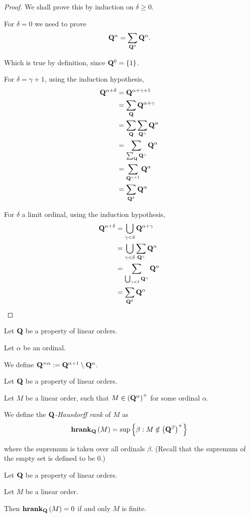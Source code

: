 \begin{proof}
  We shall prove this by induction on $\delta \ge 0$.

  For $\delta = 0$ we need to prove
  \[
    \mathbf{Q}^{\alpha} = \sum_{\mathbf{Q}^0}{\mathbf{Q}^{\alpha}}.
  \]

  Which is true by definition, since $\mathbf{Q}^0 = \left\{ {1} \right\}$.

  For $\delta = \gamma + 1$, using the induction hypothesis,
  \[
    \begin{aligned}
      \mathbf{Q}^{\alpha + \delta}
       & = \mathbf{Q}^{\alpha + \gamma + 1}                     \\
       & = \sum_{\mathbf{Q}}{\mathbf{Q}^{\alpha + \gamma}}             \\
       & = \sum_{\mathbf{Q}}{\sum_{\mathbf{Q}^{\gamma}}{\mathbf{Q}^{\alpha}}} \\
       & = \sum_{\sum_{\mathbf{Q}}{\mathbf{Q}^{\gamma}}}{\mathbf{Q}^{\alpha}} \\
       & = \sum_{\mathbf{Q}^{\gamma + 1}}{\mathbf{Q}^{\alpha}}         \\
       & = \sum_{\mathbf{Q}^{\delta}}{\mathbf{Q}^{\alpha}}
    \end{aligned}
  \]

  For $\delta$ a limit ordinal, using the induction hypothesis,
  \[
    \begin{aligned}
      \mathbf{Q}^{\alpha + \delta}
       & = \bigcup_{\gamma < \delta}{\mathbf{Q}^{\alpha + \gamma}}             \\
       & = \bigcup_{\gamma < \delta}{\sum_{\mathbf{Q}^{\gamma}}{\mathbf{Q}^{\alpha}}} \\
       & = \sum_{\bigcup_{\gamma < \delta}{\mathbf{Q}^{\gamma}}}{\mathbf{Q}^{\alpha}} \\
       & = \sum_{\mathbf{Q}^{\delta}}{\mathbf{Q}^{\alpha}}
    \end{aligned}
  \]

\end{proof}

\begin{definition}
  Let $\mathbf{Q}$ be a property of linear orders.

  Let $\alpha$ be an ordinal.

  We define $\mathbf{Q}^{= \alpha} := \mathbf{Q}^{\alpha + 1} \setminus \mathbf{Q}^{\alpha}$.
\end{definition}

\begin{definition}
  Let $\mathbf{Q}$ be a property of linear orders.

  Let $M$ be a linear order, such that
  $M \in \left( {\mathbf{Q}^{\alpha}} \right)^+$ for some ordinal $\alpha$.

  We define the \emph{$\mathbf{Q}$-Hausdorff rank} of $M$ as
  \[
    \mathbf{hrank}_{\mathbf{Q}} \left( {M} \right) = \sup \left\{ {\beta : M \notin \left( {\mathbf{Q}^{\beta}} \right)^{+}} \right\}
  \]

  where the supremum is taken over all ordinals $\beta$.
  (Recall that the supremum of the empty set is defined to be $0$.)

\end{definition}

\begin{example}
  Let $\mathbf{Q}$ be a property of linear orders.

  Let $M$ be a linear order.

  Then $\mathbf{hrank}_{\mathbf{Q}} \left( {M} \right) = 0$ if and only $M$ is finite.
\end{example}
